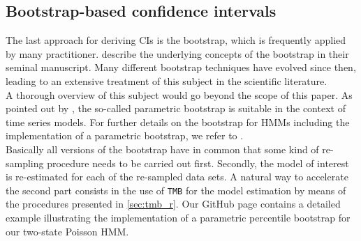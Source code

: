 \documentclass[bimj,fleqn]{w-art}\usepackage[]{graphicx}\usepackage[]{color}
\theoremstyle{plain}
\theoremstyle{definition}
\begin{document}



\subsection{Bootstrap-based confidence intervals}
\label{sec:bootstrapping}

The last approach for deriving CIs is the bootstrap, which is frequently applied by many practitioner. \citet{efron} describe the underlying concepts of the bootstrap in their seminal manuscript. Many different bootstrap techniques have evolved since then, leading to an extensive treatment of this subject in the scientific literature.\\
A thorough overview of this subject would go beyond the scope of this paper. As pointed out by \citet{hardle}, the so-called parametric bootstrap is suitable in the context of time series models. For further details on the bootstrap for HMMs including the implementation of a parametric bootstrap, we refer to \citet[][Ch.~3, pp.~56-60]{zucchini}.\\ 
Basically all versions of the bootstrap have in common that some kind of re-sampling procedure needs to be carried out first. Secondly, the model of interest is re-estimated for each of the re-sampled data sets. A natural way to accelerate the second part consists in the use of \texttt{TMB} for the model estimation by means of the procedures presented in \autoref{sec:tmb_r}. Our GitHub page contains a detailed example illustrating the implementation of a parametric percentile bootstrap for our two-state Poisson HMM.
\end{document}
